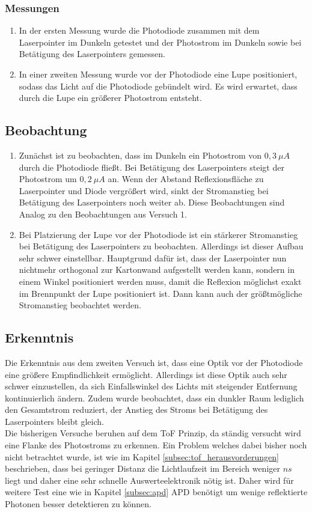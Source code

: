 \subsubsection{Messungen}
\begin{enumerate}
	\item In der ersten Messung wurde die Photodiode zusammen mit dem Laserpointer im Dunkeln getestet und der Photostrom im Dunkeln sowie bei Betätigung des Laserpointers gemessen.
	\item In einer zweiten Messung wurde vor der Photodiode eine Lupe positioniert, sodass das Licht auf die Photodiode gebündelt wird. Es wird erwartet, dass durch die Lupe ein größerer Photostrom entsteht.
\end{enumerate}
\subsection{Beobachtung}
\begin{enumerate}
	\item Zunächst ist zu beobachten, dass im Dunkeln ein Photostrom von $0,3\:\mu A$ durch die Photodiode fließt. Bei Betätigung des Laserpointers steigt der Photostrom um $0,2\:\mu A$ an. Wenn der Abstand Reflexionsfläche zu Laserpointer und Diode vergrößert wird, sinkt der Stromanstieg bei Betätigung des Laserpointers noch weiter ab. Diese Beobachtungen sind Analog zu den Beobachtungen aus Versuch 1.
	\item Bei Platzierung der Lupe vor der Photodiode ist ein stärkerer Stromanstieg bei Betätigung des Laserpointers zu beobachten. Allerdings ist dieser Aufbau sehr schwer einstellbar. Hauptgrund dafür ist, dass der Laserpointer nun nichtmehr orthogonal zur Kartonwand aufgestellt werden kann, sondern in einem Winkel positioniert werden muss, damit die Reflexion möglichst exakt im Brennpunkt der Lupe positioniert ist. Dann kann auch der größtmögliche Stromanstieg beobachtet werden. 
\end{enumerate}
\subsection{Erkenntnis}
Die Erkenntnis aus dem zweiten Versuch ist, dass eine Optik vor der Photodiode eine größere Empfindlichkeit ermöglicht. Allerdings ist diese Optik auch sehr schwer einzustellen, da sich Einfallswinkel des Lichts mit steigender Entfernung kontinuierlich ändern. Zudem wurde beobachtet, dass ein dunkler Raum lediglich den Gesamtstrom reduziert, der Anstieg des Stroms bei Betätigung des Laserpointers bleibt gleich.\\
Die bisherigen Versuche beruhen auf dem \ac{ToF} Prinzip, da ständig versucht wird eine Flanke des Photostroms zu erkennen. Ein Problem welches dabei bisher noch nicht betrachtet wurde, ist wie im Kapitel \ref{subsec:tof_herausvorderungen} beschrieben, dass bei geringer Distanz die Lichtlaufzeit im Bereich weniger $ns$ liegt und daher eine sehr schnelle Auswerteelektronik nötig ist. Daher wird für weitere Test eine wie in Kapitel \ref{subsec:apd} \ac{APD} benötigt um wenige reflektierte Photonen besser detektieren zu können.
